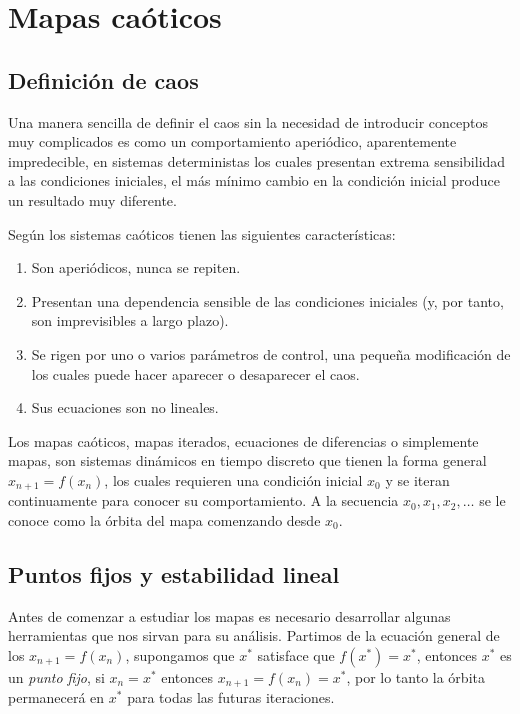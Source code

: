 \chapter{Mapas caóticos}

    \section{Definición de caos}
    
        Una manera sencilla de definir el caos sin la necesidad de introducir conceptos muy complicados es como un comportamiento aperiódico, aparentemente impredecible, en sistemas deterministas los cuales presentan extrema sensibilidad a las condiciones iniciales, el más mínimo cambio en la condición inicial produce un resultado muy diferente. \cite{Strogatz1994}

        Según \cite{Sprott2003} los sistemas caóticos tienen las siguientes características:

        \begin{enumerate}
            \item Son aperiódicos, nunca se repiten.
            \item Presentan una dependencia sensible de las condiciones iniciales (y, por tanto, son imprevisibles a largo plazo).
            \item Se rigen por uno o varios parámetros de control, una pequeña modificación de los cuales puede hacer aparecer o desaparecer el caos.
            \item Sus ecuaciones son no lineales.
        \end{enumerate}

        Los mapas caóticos, mapas iterados, ecuaciones de diferencias o simplemente mapas, son sistemas dinámicos en tiempo discreto que tienen la forma general $x_{n+1} = f(x_{n})$, los cuales requieren una condición inicial $x_{0}$ y se iteran continuamente para conocer su comportamiento. A la secuencia $x_{0}, x_{1}, x_{2} , \ldots $ se le conoce como la órbita del mapa comenzando desde $x_{0}$.

    \section{Puntos fijos y estabilidad lineal}

        Antes de comenzar a estudiar los mapas es necesario desarrollar algunas herramientas que nos sirvan para su análisis. Partimos de la ecuación general de los  $x_{n+1} = f(x_{n})$, supongamos que $x^{*}$ satisface que $f(x^{*}) = x^{*} $, entonces $x^{*}$ es un \emph{punto fijo}, si $x_{n} = x^{*} $ entonces $x_{n+1} = f(x_{n}) = x^{*} $, por lo tanto la órbita permanecerá en $x^{*} $ para todas las futuras iteraciones. 

